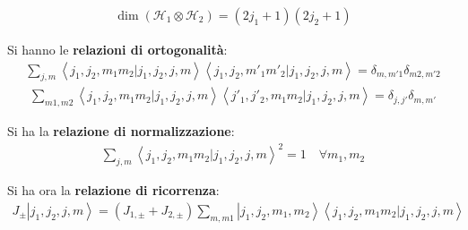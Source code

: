 
\begin{equation}\begin{split}
\dim\left(\mathcal{H}_1\otimes \mathcal{H}_2\right)=\left(2j_1+1\right)\left(2j_2+1\right)
\end{split}\end{equation}

Si hanno le \textbf{relazioni di ortogonalità}:
\begin{equation}\begin{split}
\sum_{j,m}{\left\langle j_1,j_2,m_1m_2|j_1,j_2,j,m \right\rangle\left\langle j_1,j_2,m'_1m'_2|j_1,j_2,j,m \right\rangle}=\delta _{m,m'1}\delta_{m2,m'2}
\end{split}\end{equation}
\begin{equation}\begin{split}
\sum_{m1,m2}{\left\langle j_1,j_2,m_1m_2|j_1,j_2,j,m \right\rangle\left\langle j'_1,j'_2,m_1m_2|j_1,j_2,j,m \right\rangle}=\delta _{j,j'}\delta_{m,m'}
\end{split}\end{equation}

Si ha la \textbf{relazione di normalizzazione}:
\begin{equation}\begin{split}
\sum_{j,m}{\left\langle j_1,j_2,m_1m_2|j_1,j_2,j,m \right\rangle^2}=1 \quad \forall m_1,m_2
\end{split}\end{equation}

Si ha ora la \textbf{relazione di ricorrenza}:
\begin{equation}\begin{split}
J_{\pm}\left |j_1,j_2,j,m \right\rangle=\left(J_{1,\pm}+J_{2,\pm}\right)\sum_{m,m1}{\left |j_1,j_2,m_1,m_2 \right\rangle \left\langle j_1,j_2,m_1m_2|j_1,j_2,j,m \right\rangle}
\end{split}\end{equation}
